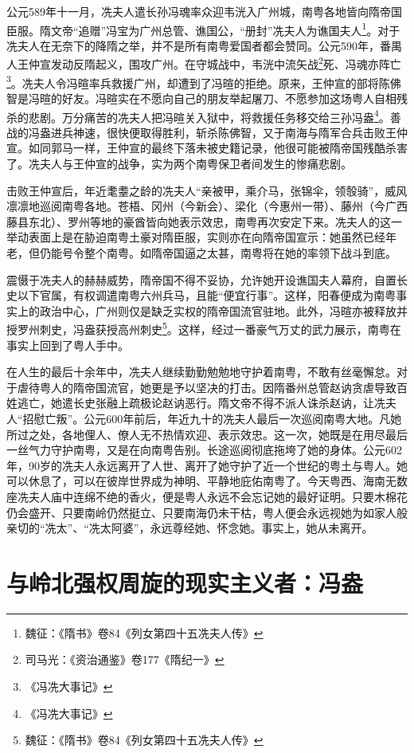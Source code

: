 公元589年十一月，冼夫人遣长孙冯魂率众迎韦洸入广州城，南粤各地皆向隋帝国臣服。隋文帝“追赠”冯宝为广州总管、谯国公，“册封”冼夫人为谯国夫人\footnote{魏征：《隋书》卷84《列女第四十五冼夫人传》}。对于冼夫人在无奈下的降隋之举，并不是所有南粤爱国者都会赞同。公元590年，番禺人王仲宣发动反隋起义，围攻广州。在守城战中，韦洸中流矢战\footnote{司马光：《资治通鉴》卷177《隋纪一》}死、冯魂亦阵亡\footnote{《冯冼大事记》}。冼夫人令冯暄率兵救援广州，却遭到了冯暄的拒绝。原来，王仲宣的部将陈佛智是冯暄的好友。冯暄实在不愿向自己的朋友举起屠刀、不愿参加这场粤人自相残杀的悲剧。万分痛苦的冼夫人把冯暄关入狱中，将救援任务移交给三孙冯盎\footnote{《冯冼大事记》}。善战的冯盎进兵神速，很快便取得胜利，斩杀陈佛智，又于南海与隋军合兵击败王仲宣。如同郭马一样，王仲宣的最终下落未被史籍记录，他很可能被隋帝国残酷杀害了。冼夫人与王仲宣的战争，实为两个南粤保卫者间发生的惨痛悲剧。

击败王仲宣后，年近耄耋之龄的冼夫人“亲被甲，乘介马，张锦伞，领彀骑”，威风凛凛地巡阅南粤各地。苍梧、冈州（今新会）、梁化（今惠州一带）、藤州（今广西藤县东北）、罗州等地的豪酋皆向她表示效忠，南粤再次安定下来。冼夫人的这一举动表面上是在胁迫南粤土豪对隋臣服，实则亦在向隋帝国宣示：她虽然已经年老，但仍能号令整个南粤。如隋帝国逼之太甚，南粤将在她的率领下战斗到底。

震慑于冼夫人的赫赫威势，隋帝国不得不妥协，允许她开设谯国夫人幕府，自置长史以下官属，有权调遣南粤六州兵马，且能“便宜行事”。这样，阳春便成为南粤事实上的政治中心，广州则仅是缺乏实权的隋帝国流官驻地。此外，冯暄亦被释放并授罗州刺史，冯盎获授高州刺史\footnote{魏征：《隋书》卷84《列女第四十五冼夫人传》}。这样，经过一番豪气万丈的武力展示，南粤在事实上回到了粤人手中。

在人生的最后十余年中，冼夫人继续勤勤勉勉地守护着南粤，不敢有丝毫懈怠。对于虐待粤人的隋帝国流官，她更是予以坚决的打击。因隋番州总管赵讷贪虐导致百姓逃亡，她遣长史张融上疏极论赵讷恶行。隋文帝不得不派人诛杀赵讷，让冼夫人“招慰亡叛”。公元600年前后，年近九十的冼夫人最后一次巡阅南粤大地。凡她所过之处，各地俚人、僚人无不热情欢迎、表示效忠。这一次，她既是在用尽最后一丝气力守护南粤，又是在向南粤告别。长途巡阅彻底拖垮了她的身体。公元602年，90岁的冼夫人永远离开了人世、离开了她守护了近一个世纪的粤土与粤人。她可以休息了，可以在彼岸世界成为神明、平静地庇佑南粤了。今天粤西、海南无数座冼夫人庙中连绵不绝的香火，便是粤人永远不会忘记她的最好证明。只要木棉花仍会盛开、只要南岭仍然挺立、只要南海仍未干枯，粤人便会永远视她为如家人般亲切的“冼太”、“冼太阿婆”，永远尊经她、怀念她。事实上，她从未离开。

\section{与岭北强权周旋的现实主义者：冯盎}

